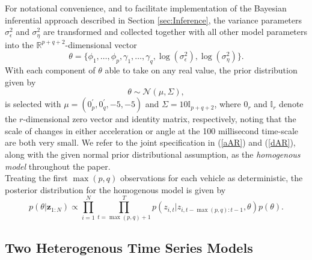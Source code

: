 \documentclass[12pt,a4paper]{article}\usepackage[]{graphicx}\usepackage[]{color}
\begin{document}
For notational convenience, and to facilitate implementation of the Bayesian inferential approach described in Section \ref{sec:Inference}, the variance parameters $\sigma^2_{\epsilon}$ and $\sigma^2_{\eta}$ are transformed and collected together with all other model parameters into the $\mathbb{R}^{p + q + 2}$-dimensional vector
\begin{equation*}
\label{thetaVec}
\theta = \{\phi_{1}, \dots, \phi_{p}, \gamma_{1}, \dots, \gamma_{q}, \log(\sigma^{2}_{\epsilon}), \log(\sigma^{2}_{\eta})\}.
\end{equation*}
With each component of $\theta$ able to take on any real value, the prior distribution given by
\begin{equation}
\label{indPrior}
\theta \sim \mathcal{N}\left(\mu, \Sigma \right),
\end{equation}
is selected with $\mu=(0_p^{\prime},0_q^{\prime},-5, -5)$ and $\Sigma = 10 \mathbb{I}_{p+q+2}$, where $0_r$ and $\mathbb{I}_r$ denote the $r$-dimensional zero vector and identity matrix, respectively, noting that the scale of changes in either acceleration or angle at the 100 millisecond time-scale are both very small. We refer to the joint specification in (\ref{aAR}) and (\ref{dAR}), along with the given normal prior distributional assumption, as the \textit{homogenous model} throughout the paper.
\\
Treating the first $\max(p, q)$ observations for each vehicle as deterministic, the posterior distribution for the homogenous model is given by
\begin{equation}
\label{homogPost}
p(\theta | \textbf{z}_{1:N}) \propto \prod_{i=1}^N \prod_{t = \max(p, q) + 1}^T p(z_{i, t} | z_{i, t-\max(p, q):t-1}, \theta)p(\theta).
\end{equation}



\subsection{Two Heterogenous Time Series Models}
\label{subsec:heterogenous}
\end{document}
